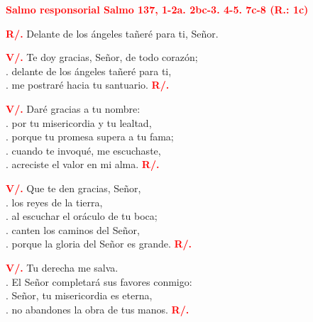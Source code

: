 \documentclass[12pt, letterpaper]{report}
\begin{document}
\Large {\bfseries \textcolor{red}{Salmo responsorial \hspace{1cm} Salmo 137, 1-2a. 2bc-3. 4-5. 7c-8 (R.: 1c)}}

\Large {\bfseries \textcolor{red}{R/.}} \hspace{1cm} Delante de los \'angeles ta\~ner\'e para ti, Se\~nor.

{\bfseries \textcolor{red}{V/.}} \hspace{1cm} Te doy gracias, Se\~nor, de todo coraz\'on;\\
. \hspace{2.5cm} delante de los \'angeles ta\~ner\'e para ti,\\
. \hspace{2.5cm} me postrar\'e hacia tu santuario.
\hspace{1cm} {\bfseries \textcolor{red}{R/.}}

{\bfseries \textcolor{red}{V/.}} \hspace{1cm} Dar\'e gracias a tu nombre:\\
. \hspace{2.5cm} por tu misericordia y tu lealtad,\\
. \hspace{2.5cm} porque tu promesa supera a tu fama;\\
. \hspace{2.5cm} cuando te invoqu\'e, me escuchaste,\\
. \hspace{2.5cm} acreciste el valor en mi alma.
\hspace{1cm} {\bfseries \textcolor{red}{R/.}}

{\bfseries \textcolor{red}{V/.}} \hspace{1cm} Que te den gracias, Se\~nor,\\
. \hspace{2.5cm} los reyes de la tierra,\\
. \hspace{2.5cm} al escuchar el or\'aculo de tu boca;\\
. \hspace{2.5cm} canten los caminos del Se\~nor,\\
. \hspace{2.5cm} porque la gloria del Se\~nor es grande.
\hspace{1cm} {\bfseries \textcolor{red}{R/.}}

{\bfseries \textcolor{red}{V/.}} \hspace{1cm} Tu derecha me salva.\\
. \hspace{2.5cm} El Se\~nor completar\'a sus favores conmigo:\\
. \hspace{2.5cm} Se\~nor, tu misericordia es eterna,\\
. \hspace{2.5cm} no abandones la obra de tus manos.
\hspace{1cm} {\bfseries \textcolor{red}{R/.}}
\end{document}
